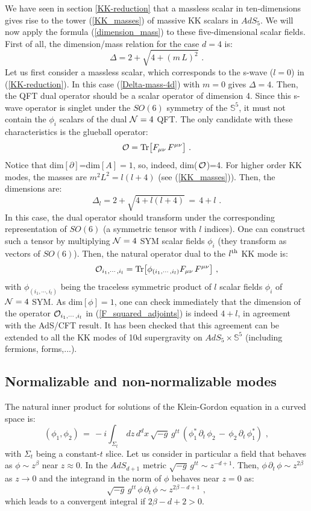 \documentclass[12pt,notitlepage]{article}
\newcommand{\beq}{\begin{equation}}
\newcommand{\eeq}{\end{equation}}
\begin{document}
We have seen in section \ref{KK-reduction} that a massless scalar in ten-dimensions gives rise to the tower (\ref{KK_masses}) of massive KK scalars in $AdS_5$. We will now apply the formula (\ref{dimension_mass}) to these five-dimensional scalar fields. First of all, the dimension/mass relation for the case  $d=4$  is:
\beq
\Delta=2+\sqrt{4+(m\,L)^2}\,\,.
\label{Delta-mass-4d}
\eeq
Let us first consider a massless scalar, which corresponds to the s-wave ($l=0$) in (\ref{KK-reduction}). In this case (\ref{Delta-mass-4d}) with $m=0$ gives $\Delta=4$. Then, the QFT dual operator should be  a scalar operator of dimension 4. Since this s-wave operator is singlet under the $SO(6)$ symmetry of the ${\mathbb S}^5$, it must not contain the $\phi_i$  scalars of the dual ${\cal N}=4$ QFT. The only candidate with these characteristics is the glueball operator:
\beq
{\cal O}={\rm Tr}\big[ F_{\mu\nu}\,F^{\mu\nu}\big]\,\,.
\eeq
Notice that  dim$[\partial]$=dim$[A]=1$, so, indeed, dim($\,{\cal O}$)=4. For higher order KK  modes, the masses are $m^2 L^2=l(l+4)$ (see (\ref{KK_masses})). Then, the dimensions are:
\beq
\Delta_l=2+\sqrt{4+l(l+4)}\,=\,4+l\,\,. 
\eeq
In this case, the dual operator should transform under the corresponding representation of $SO(6)$ (a symmetric tensor with $l$ indices). One can construct such a tensor by multiplying ${\cal N}=4$ SYM scalar fields $\phi_i$ (they transform as vectors of $SO(6)$). Then, the natural operator dual to the $l^{{\rm th}}$ KK mode is:
\beq
{\cal O}_{i_1,\cdots, i_l}={\rm Tr}\big[\phi_{(i_1,\cdots, i_l)}
 F_{\mu\nu}\,F^{\mu\nu}\big]\,\,,
 \label{F_squared_adjoints}
 \eeq
with $\phi_{(i_1,\cdots, i_l)}$ being the traceless symmetric product of $l$ scalar fields $\phi_i$  of  ${\cal N}=4$ SYM.  As dim$[\phi]=1$, one can check immediately that the dimension of the operator 
${\cal O}_{i_1,\cdots, i_l}$ in  (\ref{F_squared_adjoints})  is indeed $4+l$, in agreement with the AdS/CFT result. It has been checked that this agreement can be extended to all the KK modes of 10d supergravity on  $AdS_5\times {\mathbb S}^5$ (including fermions, forms,...). 


\subsection{Normalizable and non-normalizable modes}


The natural inner product for solutions of the Klein-Gordon equation in a curved space is:
\beq
(\phi_1,\phi_2)\,=\,-i\int_{\Sigma_t}\,
dz\,d^dx\,\sqrt{-g}\,g^{tt}\,
(\phi_1^*\,\partial_t\,\phi_2\,-\,\phi_2\,\partial_t\,\phi_1^*)\,\,,
\eeq
with $\Sigma_t$ being a constant-$t$ slice.  Let us consider in particular a field that behaves as $\phi\sim z^{\beta}$ near $z\approx 0$. In the $AdS_{d+1}$ metric $\sqrt{-g}\,g^{tt}\sim z^{-d+1}$. Then, $\phi\,\partial_t\,\phi\sim z^{2\beta}$ as $z\to 0$ and the integrand in the norm of $\phi$ behaves near $z=0$ as:
\beq
\sqrt{-g}\,g^{tt}\,
\phi\,\partial_t\,\phi\sim z^{2\beta-d+1}\,\,,
\eeq
which leads to a  convergent  integral if $2\beta-d+2>0$.
\end{document}
